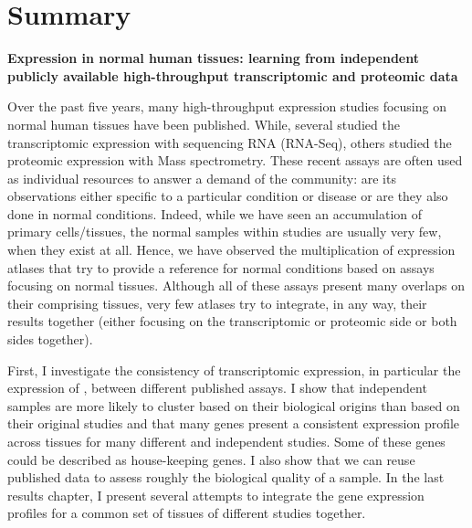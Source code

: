 \clearpage
\chapter*{Summary}
\label{ch:summary}

\begin{singlespace}

%

    \textbf{Expression in normal human tissues: learning from
    independent publicly available high-throughput transcriptomic and proteomic
    data}

    \begin{small}
    Over the past five years, many high-throughput expression studies focusing
    on normal human tissues have been published. While, several studied the
    transcriptomic expression with sequencing \gls{RNA} (\gls{RNA-Seq}), others
    studied the proteomic expression with Mass spectrometry. These recent assays
    are often used as individual resources to answer a demand of the community:
    are its observations either specific to a particular condition or disease or
    are they also done in normal conditions. Indeed, while we have seen
    an accumulation of primary cells/tissues, the normal samples within studies
    are usually very few, when they exist at all. Hence, we have observed the
    multiplication of expression atlases that try to provide
    a reference for normal conditions based on assays focusing on normal tissues.
    Although all of these assays present many overlaps on their comprising tissues,
    very few atlases try to integrate, in any way, their results together
    (either focusing on the transcriptomic or proteomic side or both sides
    together).

    First, I investigate the consistency of transcriptomic expression,
    in particular the expression of \mRNAs, between different
    published assays. I show that independent samples are more likely to
    cluster based on their biological origins than based on their original
    studies and that many genes present a consistent expression profile across
    tissues for many different and independent studies. Some of these genes could
    be described as house-keeping genes. I also show that we can reuse published
    data to assess roughly the biological quality of a sample. In the last
    results chapter, I present several attempts to integrate the gene expression
    profiles for a common set of tissues of different studies together.


\end{small}
\end{singlespace}
